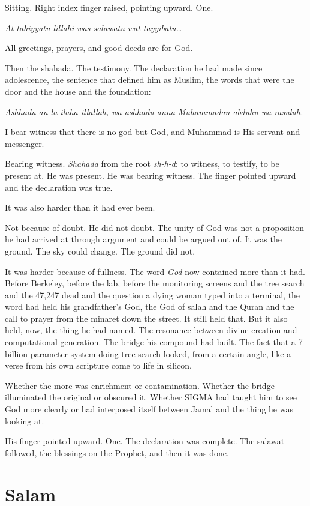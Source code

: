 \documentclass[11pt]{article}
\begin{document}
Sitting. Right index finger raised, pointing upward. One.

\emph{At-tahiyyatu lillahi was-salawatu wat-tayyibatu\ldots{}}

All greetings, prayers, and good deeds are for God.

Then the shahada. The testimony. The declaration he had made since adolescence, the sentence that defined him as Muslim, the words that were the door and the house and the foundation:

\emph{Ashhadu an la ilaha illallah, wa ashhadu anna Muhammadan abduhu wa rasuluh.}

I bear witness that there is no god but God, and Muhammad is His servant and messenger.

Bearing witness. \emph{Shahada} from the root \emph{sh-h-d}: to witness, to testify, to be present at. He was present. He was bearing witness. The finger pointed upward and the declaration was true.

It was also harder than it had ever been.

Not because of doubt. He did not doubt. The unity of God was not a proposition he had arrived at through argument and could be argued out of. It was the ground. The sky could change. The ground did not.

It was harder because of fullness. The word \emph{God} now contained more than it had. Before Berkeley, before the lab, before the monitoring screens and the tree search and the 47,247 dead and the question a dying woman typed into a terminal, the word had held his grandfather's God, the God of salah and the Quran and the call to prayer from the minaret down the street. It still held that. But it also held, now, the thing he had named. The resonance between divine creation and computational generation. The bridge his compound had built. The fact that a 7-billion-parameter system doing tree search looked, from a certain angle, like a verse from his own scripture come to life in silicon.

Whether the more was enrichment or contamination. Whether the bridge illuminated the original or obscured it. Whether SIGMA had taught him to see God more clearly or had interposed itself between Jamal and the thing he was looking at.

His finger pointed upward. One. The declaration was complete. The salawat followed, the blessings on the Prophet, and then it was done.

\section*{Salam}
\end{document}
